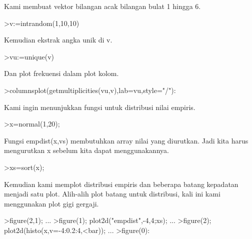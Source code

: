 \documentclass[a4paper,10pt]{article}
\begin{document}
\begin{eulernotebook}
\begin{eulercomment}
\begin{eulercomment}
\begin{eulercomment}
\begin{eulercomment}
\begin{eulercomment}
\begin{eulercomment}
\begin{eulercomment}
\begin{eulercomment}
\begin{eulercomment}
\begin{eulercomment}
\begin{eulercomment}
\begin{eulercomment}
\begin{eulercomment}
\begin{eulercomment}
\begin{eulercomment}
\begin{eulercomment}
\begin{eulercomment}
\begin{eulercomment}
\begin{eulercomment}
Kami membuat vektor bilangan acak bilangan bulat 1 hingga 6.
\end{eulercomment}
\begin{eulerprompt}
>v:=intrandom(1,10,10)
\end{eulerprompt}
\begin{euleroutput}
  [8,  5,  8,  8,  6,  8,  8,  3,  5,  5]
\end{euleroutput}
\begin{eulercomment}
Kemudian ekstrak angka unik di v.
\end{eulercomment}
\begin{eulerprompt}
>vu:=unique(v)
\end{eulerprompt}
\begin{euleroutput}
  [3,  5,  6,  8]
\end{euleroutput}
\begin{eulercomment}
Dan plot frekuensi dalam plot kolom.
\end{eulercomment}
\begin{eulerprompt}
>columnsplot(getmultiplicities(vu,v),lab=vu,style="/"):
\end{eulerprompt}
\begin{eulercomment}
Kami ingin menunjukkan fungsi untuk distribusi nilai empiris.
\end{eulercomment}
\begin{eulerprompt}
>x=normal(1,20);
\end{eulerprompt}
\begin{eulercomment}
Fungsi empdist(x,vs) membutuhkan array nilai yang diurutkan. Jadi kita
harus mengurutkan x sebelum kita dapat menggunakannya.
\end{eulercomment}
\begin{eulerprompt}
>xs=sort(x);
\end{eulerprompt}
\begin{eulercomment}
Kemudian kami memplot distribusi empiris dan beberapa batang kepadatan
menjadi satu plot. Alih-alih plot batang untuk distribusi, kali ini
kami menggunakan plot gigi gergaji.
\end{eulercomment}
\begin{eulerprompt}
>figure(2,1); ...
>figure(1); plot2d("empdist",-4,4;xs); ...
>figure(2); plot2d(histo(x,v=-4:0.2:4,<bar));  ...
>figure(0):
\end{eulerprompt}
\begin{eulercomment}

\end{eulercomment}
\end{eulercomment}
\end{eulercomment}
\end{eulercomment}
\end{eulercomment}
\end{eulercomment}
\end{eulercomment}
\end{eulercomment}
\end{eulercomment}
\end{eulercomment}
\end{eulercomment}
\end{eulercomment}
\end{eulercomment}
\end{eulercomment}
\end{eulercomment}
\end{eulercomment}
\end{eulercomment}
\end{eulercomment}
\end{eulercomment}
\end{eulernotebook}
\end{document}
